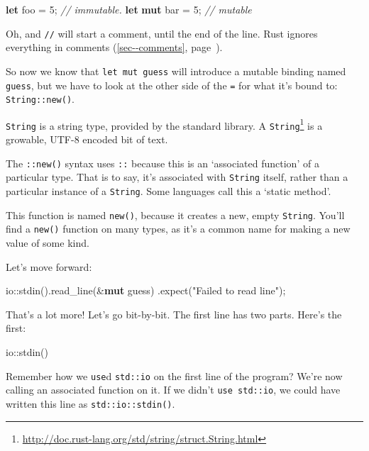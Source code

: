 \documentclass[a4paper,]{book}
\renewcommand*{\hyperref}[2][\ar]{%
  \def\ar{#2}%
  #2 (\autoref{#1}, page~\pageref{#1})}
\newenvironment{Shaded}{\begin{snugshade}}{\end{snugshade}}
\newcommand{\KeywordTok}[1]{\textcolor[rgb]{0.13,0.29,0.53}{\textbf{{#1}}}}
\newcommand{\DecValTok}[1]{\textcolor[rgb]{0.00,0.00,0.81}{{#1}}}
\newcommand{\StringTok}[1]{\textcolor[rgb]{0.31,0.60,0.02}{{#1}}}
\newcommand{\CommentTok}[1]{\textcolor[rgb]{0.56,0.35,0.01}{\textit{{#1}}}}
\newcommand{\NormalTok}[1]{{#1}}
\renewcommand{\href}[2]{#2\footnote{\url{#1}}}
\begin{document}
\begin{Shaded}
\begin{Highlighting}[]
\KeywordTok{let} \NormalTok{foo = }\DecValTok{5}\NormalTok{; }\CommentTok{// immutable.}
\KeywordTok{let} \KeywordTok{mut} \NormalTok{bar = }\DecValTok{5}\NormalTok{; }\CommentTok{// mutable}
\end{Highlighting}
\end{Shaded}

Oh, and \texttt{//} will start a comment, until the end of the line.
Rust ignores everything in \hyperref[sec--comments]{comments}.

So now we know that \texttt{let\ mut\ guess} will introduce a mutable
binding named \texttt{guess}, but we have to look at the other side of
the \texttt{=} for what it's bound to: \texttt{String::new()}.

\texttt{String} is a string type, provided by the standard library. A
\href{http://doc.rust-lang.org/std/string/struct.String.html}{\texttt{String}}
is a growable, UTF-8 encoded bit of text.

The \texttt{::new()} syntax uses \texttt{::} because this is an
`associated function' of a particular type. That is to say, it's
associated with \texttt{String} itself, rather than a particular
instance of a \texttt{String}. Some languages call this a `static
method'.

This function is named \texttt{new()}, because it creates a new, empty
\texttt{String}. You'll find a \texttt{new()} function on many types, as
it's a common name for making a new value of some kind.

Let's move forward:

\begin{Shaded}
\begin{Highlighting}[]
    \NormalTok{io::stdin().read_line(&}\KeywordTok{mut} \NormalTok{guess)}
        \NormalTok{.expect(}\StringTok{"Failed to read line"}\NormalTok{);}
\end{Highlighting}
\end{Shaded}

That's a lot more! Let's go bit-by-bit. The first line has two parts.
Here's the first:

\begin{Shaded}
\begin{Highlighting}[]
\NormalTok{io::stdin()}
\end{Highlighting}
\end{Shaded}

Remember how we \texttt{use}d \texttt{std::io} on the first line of the
program? We're now calling an associated function on it. If we didn't
\texttt{use\ std::io}, we could have written this line as
\texttt{std::io::stdin()}.
\end{document}
